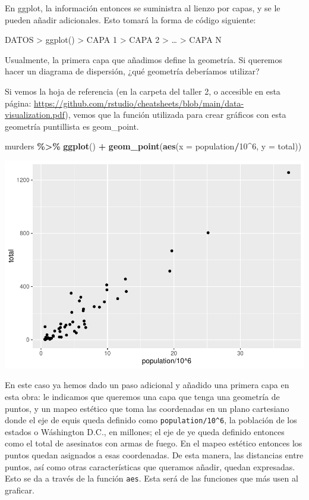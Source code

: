 \documentclass[
]{article}
\newenvironment{Shaded}{\begin{snugshade}}{\end{snugshade}}
\newcommand{\AttributeTok}[1]{\textcolor[rgb]{0.13,0.29,0.53}{#1}}
\newcommand{\DecValTok}[1]{\textcolor[rgb]{0.00,0.00,0.81}{#1}}
\newcommand{\FunctionTok}[1]{\textcolor[rgb]{0.13,0.29,0.53}{\textbf{#1}}}
\newcommand{\NormalTok}[1]{#1}
\newcommand{\SpecialCharTok}[1]{\textcolor[rgb]{0.81,0.36,0.00}{\textbf{#1}}}
\begin{document}
En ggplot, la información entonces se suministra al lienzo por capas, y
se le pueden añadir adicionales. Esto tomará la forma de código
siguiente:

DATOS \textbar\textgreater{} ggplot() \textbar\textgreater{} CAPA 1
\textbar\textgreater{} CAPA 2 \textbar\textgreater{} \ldots{}
\textbar\textgreater{} CAPA N

Usualmente, la primera capa que añadimos define la geometría. Si
queremos hacer un diagrama de dispersión, ¿qué geometría deberíamos
utilizar?

Si vemos la hoja de referencia (en la carpeta del taller 2, o accesible
en esta página:
\url{https://github.com/rstudio/cheatsheets/blob/main/data-visualization.pdf}),
vemos que la función utilizada para crear gráficos con esta geometría
puntillista es geom\_point.

\begin{Shaded}
\begin{Highlighting}[]
\NormalTok{murders }\SpecialCharTok{\%\textgreater{}\%}
  \FunctionTok{ggplot}\NormalTok{() }\SpecialCharTok{+}
  \FunctionTok{geom\_point}\NormalTok{(}\FunctionTok{aes}\NormalTok{(}\AttributeTok{x =}\NormalTok{ population}\SpecialCharTok{/}\DecValTok{10}\SpecialCharTok{\^{}}\DecValTok{6}\NormalTok{, }\AttributeTok{y =}\NormalTok{ total))}
\end{Highlighting}
\end{Shaded}

\includegraphics{Taller-2_files/figure-latex/Añadiendo una geometría-1.pdf}

En este caso ya hemos dado un paso adicional y añadido una primera capa
en esta obra: le indicamos que queremos una capa que tenga una geometría
de puntos, y un mapeo estético que toma las coordenadas en un plano
cartesiano donde el eje de equis queda definido como
\texttt{population/10\^{}6}, la población de los estados o Wáshington
D.C., en millones; el eje de ye queda definido entonces como el total de
asesinatos con armas de fuego. En el mapeo estético entonces los puntos
quedan asignados a esas coordenadas. De esta manera, las distancias
entre puntos, así como otras características que queramos añadir, quedan
expresadas. Esto se da a través de la función \texttt{aes}. Esta será de
las funciones que más usen al graficar.
\end{document}
